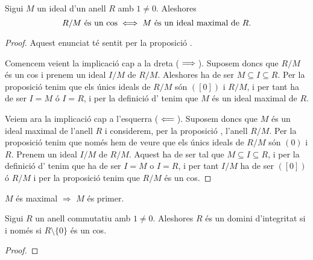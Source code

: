 \documentclass[../Apunts.tex]{subfiles}
\begin{document}
	\begin{proposition}
		\label{prop:condició equivalent a ideal maximal per R/M cos}
		Sigui \(M\) un ideal d'un anell \(R\) amb \(1\neq 0\). Aleshores %
		\[R/M\text{ és un cos}\iff M\text{ és un ideal maximal de }R.\]
		\begin{proof}
			Aquest enunciat té sentit per la proposició .
			
			Comencem veient la implicació cap a la dreta (\(\implies\)). Suposem doncs que \(R/M\) és un cos i prenem un ideal \(I/M\) %
			 de \(R/M\). Aleshores ha de ser \(M\subseteq I\subseteq R\). Per la proposició  tenim que els únics ideals de \(R/M\) són \(([0])\) i \(R/M\), i per tant ha de ser \(I=M\) ó \(I=R\), i per la definició d' tenim que \(M\) és un ideal maximal de \(R\).
			
			Veiem ara la implicació cap a l'esquerra (\(\impliedby\)). Suposem doncs que \(M\) és un ideal maximal de l'anell \(R\) i considerem, per la proposició , l'anell \(R/M\). Per la proposició  tenim que només hem de veure que els únics ideals de \(R/M\) són \((0)\) i \(R\). Prenem un ideal \(I/M\) de \(R/M\). Aquest ha de ser tal que \(M\subseteq I\subseteq R\), i per la definició d' tenim que ha de ser \(I=M\) o \(I=R\), i per tant \(I/M\) ha de ser \(([0])\) ó \(R/M\) i per la proposició  tenim que \(R/M\) és un cos.
		\end{proof}
	\end{proposition}
	\begin{corollary}
		\label{corollary:M maximal implica M primer}
		\(M\) és maximal \(\Longrightarrow\) \(M\) és primer.
	\end{corollary}
	\begin{theorem}
		Sigui \(R\) un anell commutatiu amb \(1\neq0\). Aleshores \(R\) és un domini d'integritat si i només si \(R\setminus\{0\}\) és un cos. %
		\begin{proof}
		\end{proof}
	\end{theorem}
\end{document}

